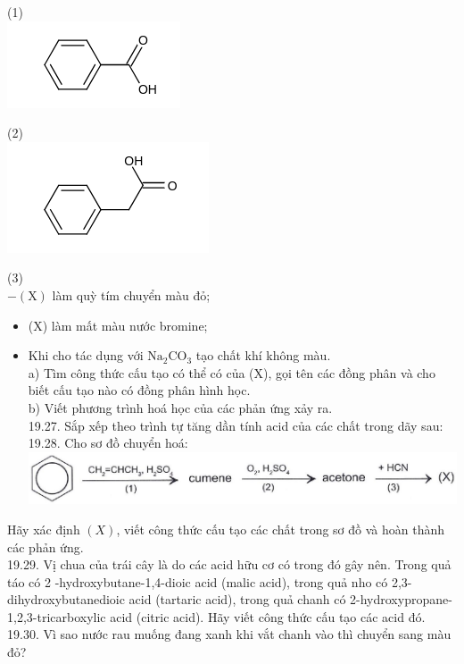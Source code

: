 \documentclass[10pt]{article}
\begin{document}
(1)\\
\includegraphics{smile-e102adc0f7f4e8ac706500746319eb57893b6d19}

(2)\\
\includegraphics{smile-8435e8636825d2b43dc1d19e6bf6f38a9b02997e}

(3)\\
$-(\mathrm{X})$ làm quỳ tím chuyển màu đỏ;

\begin{itemize}
  \item (X) làm mất màu nước bromine;
  \item Khi cho tác dụng với $\mathrm{Na}_{2} \mathrm{CO}_{3}$ tạo chất khí không màu.\\
a) Tìm công thức cấu tạo có thể có của (X), gọi tên các đồng phân và cho biết cấu tạo nào có đồng phân hình học.\\
b) Viết phương trình hoá học của các phản ứng xảy ra.\\
19.27. Sắp xếp theo trình tự tăng dần tính acid của các chất trong dãy sau:\\
19.28. Cho sơ đồ chuyển hoá:\\
\includegraphics[max width=\textwidth, center]{2025_10_23_ae7aef68fb3b41082d29g-48}
\end{itemize}

Hãy xác định $(X)$, viết công thức cấu tạo các chất trong sơ đồ và hoàn thành các phản ứng.\\
19.29. Vị chua của trái cây là do các acid hữu cơ có trong đó gây nên. Trong quả táo có 2 -hydroxybutane-1,4-dioic acid (malic acid), trong quả nho có 2,3-dihydroxybutanedioic acid (tartaric acid), trong quả chanh có 2-hydroxypropane-1,2,3-tricarboxylic acid (citric acid). Hãy viết công thức cấu tạo các acid đó.\\
19.30. Vì sao nước rau muống đang xanh khi vắt chanh vào thì chuyển sang màu đỏ?
\end{document}
